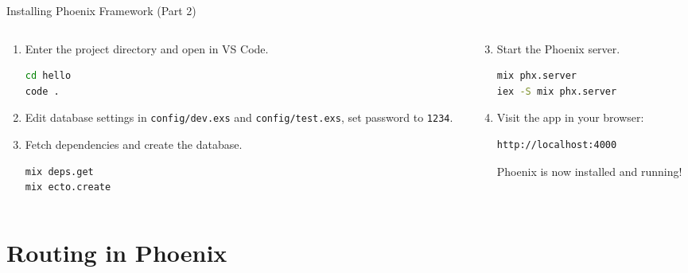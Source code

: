 \documentclass[aspectratio=169, table]{beamer}
\begin{document}
\begin{frame}[fragile]{Installing Phoenix Framework (Part 2)}
\vspace{20pt}

\begin{columns}
  \begin{column}[T]{0.6\textwidth}
    \begin{enumerate}
	   \item Enter the project directory and open in VS Code.
      \begin{lstlisting}[language=bash]
cd hello
code .
      \end{lstlisting}
      \item Edit database settings in \texttt{config/dev.exs}  
      and \texttt{config/test.exs}, set password to \texttt{1234}.
      
      \item Fetch dependencies and create the database.
      \begin{lstlisting}[language=bash]
mix deps.get
mix ecto.create
      \end{lstlisting}
    \end{enumerate}
  \end{column}

  \begin{column}[T]{0.4\textwidth}
    \begin{enumerate}
      \setcounter{enumi}{2}
      \item Start the Phoenix server.
      \begin{lstlisting}[language=bash]
mix phx.server
iex -S mix phx.server
      \end{lstlisting}

      \item Visit the app in your browser:
      \begin{lstlisting}[language=bash]
http://localhost:4000
      \end{lstlisting}

      Phoenix is now installed and running!
    \end{enumerate}
  \end{column}
\end{columns}
\end{frame}

\section{Routing in Phoenix}
\end{document}
